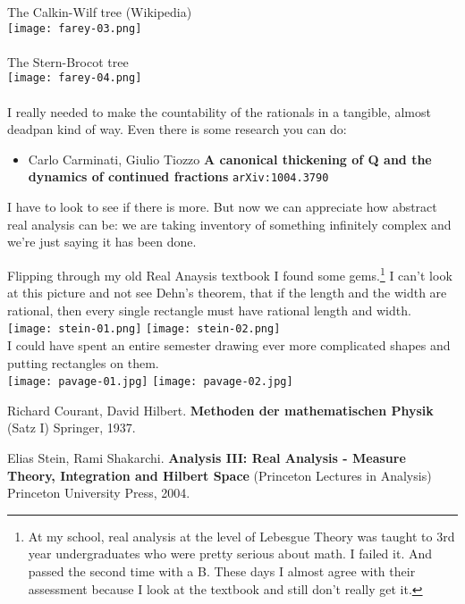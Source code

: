 \documentclass[12pt]{article}
\begin{document}
\newpage

\noindent The Calkin-Wilf tree (Wikipedia) \\
\texttt{[image: farey-03.png]} \\ \\
The Stern-Brocot tree \\ 
\texttt{[image: farey-04.png]} \\ \\
I really needed to make the countability of the rationals in a tangible, almost deadpan kind of way.  Even there is some research you can do:
\begin{itemize}
\item Carlo Carminati, Giulio Tiozzo \textbf{A canonical thickening of Q and the dynamics of continued fractions} \texttt{arXiv:1004.3790}
\end{itemize}
I have to look to see if there is more.  But now we can appreciate how abstract real analysis can be: we are taking inventory of something infinitely complex and we're just saying it has been done.

\newpage

\noindent Flipping through my old Real Anaysis textbook I found some gems.\footnote{At my school, real analysis at the level of Lebesgue Theory was taught to 3rd year undergraduates who were pretty serious about math. I failed it.  And passed the second time with a B.  These days I almost agree with their assessment because I look at the textbook and still don't really get it.}  I can't look at this picture and not see Dehn's theorem, that if the length and the width are rational, then every single rectangle must have rational length and width.\\ 
\texttt{[image: stein-01.png]}
\texttt{[image: stein-02.png]} \\ 
I could have spent an entire semester drawing ever more complicated shapes and putting rectangles on them. \\

\texttt{[image: pavage-01.jpg]}\hspace{1in}
\texttt{[image: pavage-02.jpg]}

\begin{thebibliography}{}

\item Richard Courant, David Hilbert.  \textbf{Methoden der mathematischen Physik} (Satz I) Springer, 1937. 

\item Elias Stein, Rami Shakarchi.   \textbf{Analysis III: Real Analysis - Measure Theory, Integration and Hilbert Space }(Princeton Lectures in Analysis) Princeton University Press, 2004.


\end{thebibliography}
\end{document}
